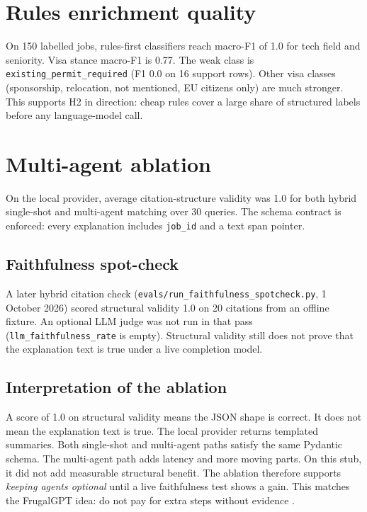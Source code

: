 \section{Rules enrichment quality}
\label{sec:rules-f1}

On 150 labelled jobs, rules-first classifiers reach macro-F1 of 1.0 for tech field and seniority. Visa stance macro-F1 is 0.77. The weak class is \texttt{existing\_permit\_required} (F1 0.0 on 16 support rows). Other visa classes (sponsorship, relocation, not mentioned, EU citizens only) are much stronger. This supports H2 in direction: cheap rules cover a large share of structured labels before any language-model call.

\section{Multi-agent ablation}
\label{sec:agent}

On the local provider, average citation-structure validity was 1.0 for both hybrid single-shot and multi-agent matching over 30 queries. The schema contract is enforced: every explanation includes \texttt{job\_id} and a text span pointer.

\subsection{Faithfulness spot-check}

A later hybrid citation check (\texttt{evals/run\_faithfulness\_spotcheck.py}, 1 October 2026) scored structural validity 1.0 on 20 citations from an offline fixture. An optional LLM judge was not run in that pass (\texttt{llm\_faithfulness\_rate} is empty). Structural validity still does not prove that the explanation text is true under a live completion model.

\subsection{Interpretation of the ablation}

A score of 1.0 on structural validity means the JSON shape is correct. It does not mean the explanation text is true. The local provider returns templated summaries. Both single-shot and multi-agent paths satisfy the same Pydantic schema. The multi-agent path adds latency and more moving parts. On this stub, it did not add measurable structural benefit. The ablation therefore supports \emph{keeping agents optional} until a live faithfulness test shows a gain. This matches the FrugalGPT idea: do not pay for extra steps without evidence .

